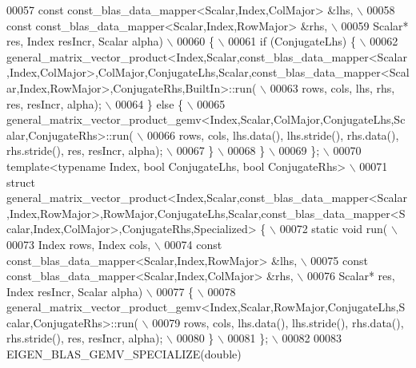 \begin{DoxyCode}
00057 \textcolor{preprocessor}{  const const\_blas\_data\_mapper<Scalar,Index,ColMajor> &lhs, \(\backslash\)}
00058 \textcolor{preprocessor}{  const const\_blas\_data\_mapper<Scalar,Index,RowMajor> &rhs, \(\backslash\)}
00059 \textcolor{preprocessor}{  Scalar* res, Index resIncr, Scalar alpha) \(\backslash\)}
00060 \textcolor{preprocessor}{\{ \(\backslash\)}
00061 \textcolor{preprocessor}{  if (ConjugateLhs) \{ \(\backslash\)}
00062 \textcolor{preprocessor}{   
       general\_matrix\_vector\_product<Index,Scalar,const\_blas\_data\_mapper<Scalar,Index,ColMajor>,ColMajor,ConjugateLhs,Scalar,const\_blas\_data\_mapper<Scalar,Index,RowMajor>,ConjugateRhs,BuiltIn>::run( \(\backslash\)}
00063 \textcolor{preprocessor}{      rows, cols, lhs, rhs, res, resIncr, alpha); \(\backslash\)}
00064 \textcolor{preprocessor}{  \} else \{ \(\backslash\)}
00065 \textcolor{preprocessor}{    general\_matrix\_vector\_product\_gemv<Index,Scalar,ColMajor,ConjugateLhs,Scalar,ConjugateRhs>::run( \(\backslash\)}
00066 \textcolor{preprocessor}{      rows, cols, lhs.data(), lhs.stride(), rhs.data(), rhs.stride(), res, resIncr, alpha); \(\backslash\)}
00067 \textcolor{preprocessor}{  \} \(\backslash\)}
00068 \textcolor{preprocessor}{\} \(\backslash\)}
00069 \textcolor{preprocessor}{\}; \(\backslash\)}
00070 \textcolor{preprocessor}{template<typename Index, bool ConjugateLhs, bool ConjugateRhs> \(\backslash\)}
00071 \textcolor{preprocessor}{struct
       general\_matrix\_vector\_product<Index,Scalar,const\_blas\_data\_mapper<Scalar,Index,RowMajor>,RowMajor,ConjugateLhs,Scalar,const\_blas\_data\_mapper<Scalar,Index,ColMajor>,ConjugateRhs,Specialized> \{ \(\backslash\)}
00072 \textcolor{preprocessor}{static void run( \(\backslash\)}
00073 \textcolor{preprocessor}{  Index rows, Index cols, \(\backslash\)}
00074 \textcolor{preprocessor}{  const const\_blas\_data\_mapper<Scalar,Index,RowMajor> &lhs, \(\backslash\)}
00075 \textcolor{preprocessor}{  const const\_blas\_data\_mapper<Scalar,Index,ColMajor> &rhs, \(\backslash\)}
00076 \textcolor{preprocessor}{  Scalar* res, Index resIncr, Scalar alpha) \(\backslash\)}
00077 \textcolor{preprocessor}{\{ \(\backslash\)}
00078 \textcolor{preprocessor}{    general\_matrix\_vector\_product\_gemv<Index,Scalar,RowMajor,ConjugateLhs,Scalar,ConjugateRhs>::run( \(\backslash\)}
00079 \textcolor{preprocessor}{      rows, cols, lhs.data(), lhs.stride(), rhs.data(), rhs.stride(), res, resIncr, alpha); \(\backslash\)}
00080 \textcolor{preprocessor}{\} \(\backslash\)}
00081 \textcolor{preprocessor}{\}; \(\backslash\)}
00082 \textcolor{preprocessor}{}
00083 EIGEN\_BLAS\_GEMV\_SPECIALIZE(\textcolor{keywordtype}{double})

\end{DoxyCode}

